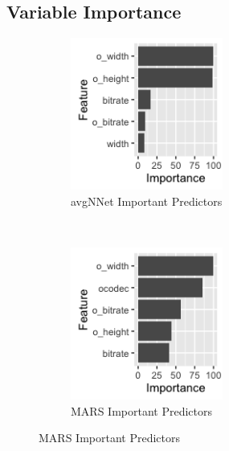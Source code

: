 \documentclass[letterpaper,12pt,titlepage,oneside,final]{report}
\begin{document}
        \subsection {Variable Importance}
            \begin{figure}[!ht]
            \begin{subfigure}[t]{0.5\textwidth}
                \centering
                \includegraphics[height=5cm]{avnnetvarimp}
                \caption{avgNNet Important Predictors}
                \label{avnnetvarimp}
            \end{subfigure}%
                ~ 
            \begin{subfigure}[t]{0.5\textwidth}
                \centering
                \includegraphics[height=5cm]{marsvarimp}
                \caption{MARS Important Predictors}
                \label{marsvarimp}
            \end{subfigure}
            \end{figure}
\end{document}
